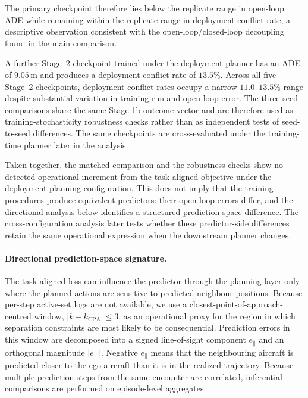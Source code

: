 \documentclass[11pt]{article}
\theoremstyle{plain}
\theoremstyle{definition}
\begin{document}
The primary checkpoint therefore lies below the replicate range in
open-loop ADE while remaining within the replicate range in
deployment conflict rate, a descriptive observation consistent with
the open-loop/closed-loop decoupling found in the main comparison.

A further Stage~2 checkpoint trained under the deployment planner has
an ADE of $9.05$\,m and produces a deployment conflict rate of
$13.5\%$. Across all five Stage~2 checkpoints, deployment conflict
rates occupy a narrow $11.0$--$13.5\%$ range despite substantial
variation in training run and open-loop error. The three seed
comparisons share the same Stage-1b outcome vector and are therefore
used as training-stochasticity robustness checks rather than as
independent tests of seed-to-seed differences. The same checkpoints
are cross-evaluated under the training-time planner later in the
analysis.



Taken together, the matched comparison and the robustness checks show
no detected operational increment from the task-aligned objective
under the deployment planning configuration. This does not imply that
the training procedures produce equivalent predictors: their
open-loop errors differ, and the directional analysis below identifies
a structured prediction-space difference. The cross-configuration
analysis later tests whether these predictor-side differences retain
the same operational expression when the downstream planner changes.

\paragraph{Directional prediction-space signature.}

The task-aligned loss can influence the predictor through the planning
layer only where the planned actions are sensitive to predicted
neighbour positions. Because per-step active-set logs are not
available, we use a closest-point-of-approach-centred window,
$|k-k_{\mathrm{CPA}}|\leq3$, as an operational proxy for the region
in which separation constraints are most likely to be consequential.
Prediction errors in this window are decomposed into a signed
line-of-sight component $e_{\parallel}$ and an orthogonal magnitude
$|e_{\perp}|$. Negative $e_{\parallel}$ means that the neighbouring
aircraft is predicted closer to the ego aircraft than it is in the
realized trajectory. Because multiple prediction steps from the same
encounter are correlated, inferential comparisons are performed on
episode-level aggregates.
\end{document}
